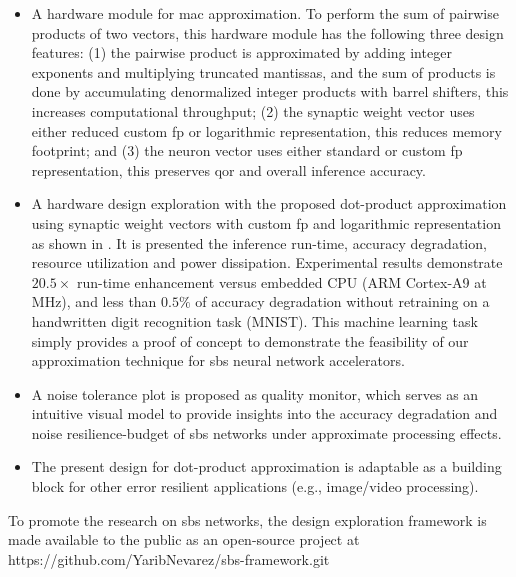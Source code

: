 \begin{itemize}
	\item A hardware module for \gls{mac} approximation. To perform the sum of pairwise products of two vectors, this hardware module has the following three design features: (1) the pairwise product is approximated by adding integer exponents and multiplying truncated mantissas, and the sum of products is done by accumulating denormalized integer products with barrel shifters, this increases computational throughput; (2) the synaptic weight vector uses either reduced custom \gls{fp} or logarithmic representation, this reduces memory footprint; and (3) the neuron vector uses either standard or custom \gls{fp} representation, this preserves \gls{qor} and overall inference accuracy.
	\item A hardware design exploration with the proposed dot-product approximation using synaptic weight vectors with custom \gls{fp} and logarithmic representation as shown in . It is presented the inference run-time, accuracy degradation, resource utilization and power dissipation. Experimental results demonstrate $20.5\times$ run-time enhancement versus embedded CPU (ARM Cortex-A9 at \unit[666]{MHz}), and less than $0.5\%$ of accuracy degradation without retraining on a handwritten digit recognition task (MNIST). This machine learning task simply provides a proof of concept to demonstrate the feasibility of our approximation technique for \gls{sbs} neural network accelerators.
	\item A noise tolerance plot is proposed as quality monitor, which serves as an intuitive visual model to provide insights into the accuracy degradation and noise resilience-budget of \gls{sbs} networks under approximate processing effects.
	\item The present design for dot-product approximation is adaptable as a building block for other error resilient applications (e.g., image/video processing).
\end{itemize}

To promote the research on \gls{sbs} networks, the design exploration framework is made available to the public as an open-source project at https://github.com/YaribNevarez/sbs-framework.git

